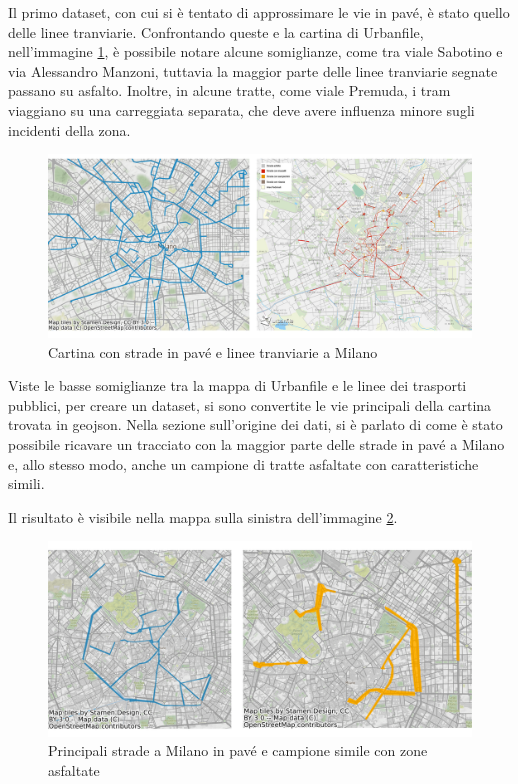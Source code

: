 \documentclass[a4paper,12pt]{report}
\begin{document}
Il primo dataset, con cui si è tentato di approssimare le vie in pavé, è stato quello 
delle linee tranviarie. 
Confrontando queste e la cartina di Urbanfile, nell'immagine \ref{fig:tram-pave-milano}, 
è possibile notare alcune somiglianze, come tra viale Sabotino e via 
Alessandro Manzoni, tuttavia la maggior parte delle linee tranviarie segnate 
passano su asfalto. 
Inoltre, in alcune tratte, come viale Premuda, i tram viaggiano su una carreggiata separata, 
che deve avere influenza minore sugli incidenti della zona. 

\begin{figure}
    \includegraphics[width=\linewidth]{../src/tram/tram_milano.png}
    \caption{Cartina con strade in pavé e linee tranviarie a Milano}
    \label{fig:tram-pave-milano}
\end{figure}

Viste le basse somiglianze tra la mappa di Urbanfile e le linee dei trasporti pubblici, 
per creare un dataset, si sono convertite le vie principali della cartina trovata 
in geojson. 
Nella sezione sull'origine dei dati, si è parlato di come è stato possibile ricavare 
un tracciato con la maggior parte delle strade in pavé a Milano e, allo stesso modo, 
anche un campione di tratte asfaltate con caratteristiche simili. 

Il risultato è visibile nella mappa sulla sinistra dell'immagine \ref{fig:mappa-pave}. 

\begin{figure}
    \includegraphics[width=\linewidth]{img_unite/mappa_pave_asfalto.png}
    \caption{Principali strade a Milano in pavé e campione simile con zone asfaltate}
    \label{fig:mappa-pave}
\end{figure}
\end{document}
